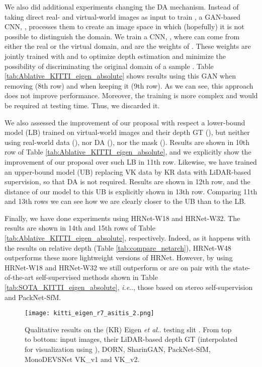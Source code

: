 \documentclass[journal]{IEEEtran}
\makeatletter
\DeclareRobustCommand\onedot{\futurelet\@let@token\@onedot}
\def\@onedot{\ifx\@let@token.\else.\null\fi\xspace}
\def\ie{\emph{i.e}\onedot} \def\Ie{\emph{I.e}\onedot}
\def\etal{\emph{et al}\onedot}
\newcommand{\Tab}[1]{Table \ref{tab:#1}}
\makeatother
\begin{document}
We also did additional experiments changing the DA mechanism. Instead of taking direct real- and virtual-world images as input to train , a GAN-based CNN, , processes them to create an image space in which (hopefully) it is not possible to distinguish the domain. We train a CNN, , where  can come from either the real or the virtual domain, and  are the weights of . These weights are jointly trained with  and  to optimize depth estimation and minimize the possibility of discriminating the original domain of a sample . Table \ref{tab:Ablative_KITTI_eigen_absolute} shows results using this GAN when removing  (8th row) and when keeping it (9th row). As we can see, this approach does not improve performance. Moreover, the training is more complex and  would be required at testing time. Thus, we discarded it.

We also assessed the improvement of our proposal with respect a lower-bound model (LB) trained on virtual-world images and their depth GT (), but neither using real-world data (), nor DA (), nor the mask (). Results are shown in 10th row of \Tab{Ablative_KITTI_eigen_absolute}, and we explicitly show the improvement of our proposal over such LB in 11th row. Likewise, we have trained an upper-bound model (UB) replacing VK data by KR data with LiDAR-based supervision, so that DA is not required. Results are shown in 12th row, and the distance of our model to this UB is explicitly shown in 13th row. Comparing 11th and 13th rows we can see how we are clearly closer to the UB than to the LB. 

Finally, we have done experiments using HRNet-W18 and HRNet-W32. The results are shown in 14th and 15th rows of \Tab{Ablative_KITTI_eigen_absolute}, respectively. Indeed, as it happens with the results on relative depth (\Tab{compare_netarch}), HRNet-W48 outperforms these more lightweight versions of HRNet. However, by using HRNet-W18 and HRNet-W32 we still outperform or are on pair with the state-of-the-art self-supervised methods shown in \Tab{SOTA_KITTI_eigen_absolute}, {\ie}, those based on stereo self-supervision and PackNet-SfM.

\begin{figure*}
    \centering
    \texttt{[image: kitti\_eigen\_r7\_asitis\_2.png]}
    \caption{Qualitative results on the (KR) Eigen {\etal} testing slit \cite{Eigen:2014}. From top  to bottom: input images, their LiDAR-based depth GT (interpolated for visualization using \cite{Premebida:2014}), DORN, SharinGAN, PackNet-SfM, MonoDEVSNet VK\_v1 and VK\_v2.}
    \label{fig:kitti_eigen_qualitative}
\end{figure*}
\end{document}
